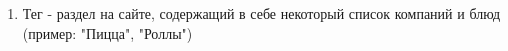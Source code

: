 \begin{enumerate}
  \item Тег - раздел на сайте, содержащий в себе некоторый список компаний и блюд
  (пример: "Пицца", "Роллы")
\end{enumerate}
